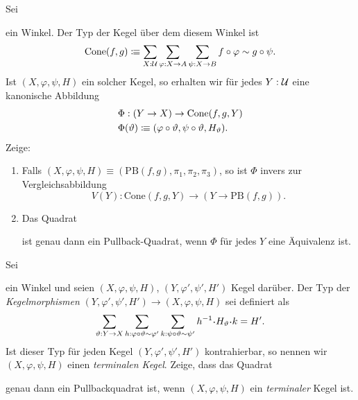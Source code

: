 \documentclass{uebung}
\begin{document}
\begin{exercise}
  Sei
  ein Winkel.
  Der Typ der Kegel über dem diesem Winkel ist
  $$
  \mathrm{Cone}(f,g) \vcentcolon\mspace{-1.2mu}\equiv \sum_{X:\mathcal{U}}\sum_{\varphi:X\to A}\sum_{\psi:X\to B} f\circ\varphi \sim g\circ\psi.
  $$
  Ist $(X,\varphi,\psi,H)$ ein solcher Kegel, so erhalten wir für jedes $Y:\mathcal{U}$ eine kanonische Abbildung
  \begin{align*}
    &\Phi:(Y \to X) \to \mathrm{Cone}(f,g,Y)\\
    &\Phi(\vartheta)\vcentcolon\mspace{-1.2mu}\equiv (\varphi\circ\vartheta,\psi\circ\vartheta,H_\vartheta).
  \end{align*}
  Zeige:
  \begin{enumerate}
    \item Falls $(X,\varphi,\psi,H)\equiv(\mathrm{PB}(f,g),\pi_1,\pi_2,\pi_3)$, so ist $\Phi$ invers zur Vergleichsabbildung
      $$
      V(Y):\mathrm{Cone}(f,g,Y)\to (Y\to\mathrm{PB}(f,g)).
      $$
    \item Das Quadrat
      \begin{center}
      \end{center}
      ist genau dann ein Pullback-Quadrat, wenn $\Phi$ für jedes $Y$ eine Äquivalenz ist.
  \end{enumerate}
\end{exercise}

\begin{exercise}
  Sei
  ein Winkel und seien $(X,\varphi,\psi,H)$, $(Y,\varphi',\psi',H')$ Kegel darüber.
  Der Typ der \emph{Kegelmorphismen} $(Y,\varphi',\psi',H')\to (X,\varphi,\psi,H)$ sei definiert als
  $$
  \sum_{\vartheta:Y \to X}
  \sum_{h:\varphi\circ\vartheta\sim\varphi'}
  \sum_{k:\psi\circ\vartheta\sim\psi'}
  h^{-1} \kon H_\vartheta \kon k = H'.
  $$
  Ist dieser Typ für jeden Kegel $(Y,\varphi',\psi',H')$ kontrahierbar, so nennen wir $(X,\varphi,\psi,H)$ einen \emph{terminalen Kegel}.
  Zeige, dass das Quadrat
  \begin{center}
  \end{center}
  genau dann ein Pullbackquadrat ist, wenn $(X,\varphi,\psi,H)$ ein \emph{terminaler} Kegel ist.
\end{exercise}
\end{document}
